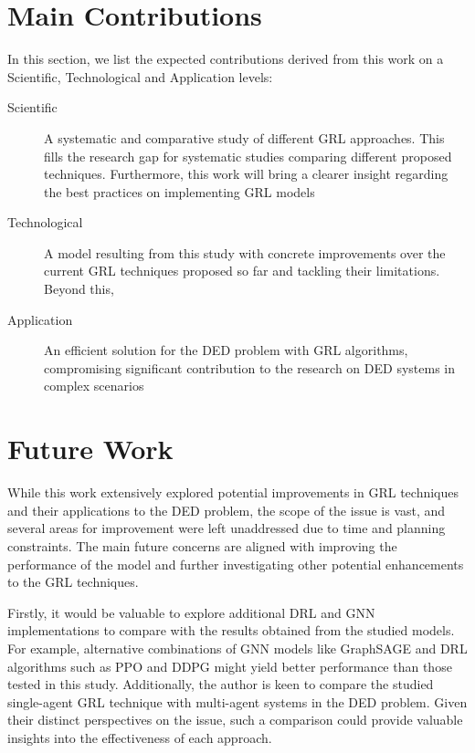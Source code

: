 \section{Main Contributions}

In this section, we list the expected contributions derived from this work on a Scientific, Technological and Application levels:
\begin{description}
	\item[Scientific] A systematic and comparative study of different \ac{GRL} approaches. This fills the research gap for systematic studies comparing different proposed techniques. Furthermore, this work will bring a clearer insight regarding the best practices on implementing \ac{GRL} models
	\item[Technological] A model resulting from this study with concrete improvements over the current \ac{GRL} techniques proposed so far and tackling their limitations. Beyond this, 
	\item[Application] An efficient solution for the \ac{DED} problem with \ac{GRL} algorithms, compromising significant contribution to the research on \ac{DED} systems in complex scenarios
\end{description}

\section{Future Work}

While this work extensively explored potential improvements in \ac{GRL} techniques and their applications to the \ac{DED} problem, the scope of the issue is vast, and several areas for improvement were left unaddressed due to time and planning constraints. The main future concerns are aligned with improving the performance of the model and further investigating other potential enhancements to the \ac{GRL} techniques. \par

Firstly, it would be valuable to explore additional \ac{DRL} and \ac{GNN} implementations to compare with the results obtained from the studied models. For example, alternative combinations of \ac{GNN} models like GraphSAGE and \ac{DRL} algorithms such as PPO and DDPG might yield better performance than those tested in this study. Additionally, the author is keen to compare the studied single-agent \ac{GRL} technique with multi-agent systems in the \ac{DED} problem. Given their distinct perspectives on the issue, such a comparison could provide valuable insights into the effectiveness of each approach. \par

